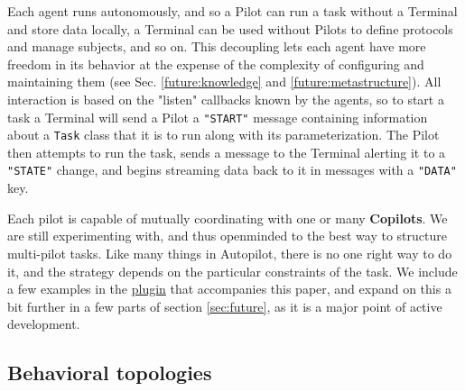 Each agent runs autonomously, and so a Pilot can run a task without a Terminal and store data locally, a Terminal can be used without Pilots to define protocols and manage subjects, and so on. This decoupling lets each agent have more freedom in its behavior at the expense of the complexity of configuring and maintaining them (see Sec. \ref{future:knowledge} and \ref{future:metastructure}). All interaction is based on the "listen" callbacks known by the agents, so to start a task a Terminal will send a Pilot a \texttt{"START"} message containing information about a \texttt{Task} class that it is to run along with its parameterization. The Pilot then attempts to run the task, sends a message to the Terminal alerting it to a \texttt{"STATE"} change, and begins streaming data back to it in messages with a \texttt{"DATA"} key.

Each pilot is capable of mutually coordinating with one or many \textbf{Copilots}. We are still experimenting with, and thus openminded to the best way to structure multi-pilot tasks. Like many things in Autopilot, there is no one right way to do it, and the strategy depends on the particular constraints of the task. We include a few examples in the \href{https://wiki.auto-pi-lot.com/index.php/Plugin:Autopilot\_Paper}{plugin} that accompanies this paper, and expand on this a bit further in a few parts of section \ref{sec:future}, as it is a major point of active development.


\subsection{Behavioral topologies}
\label{sec:topology}

